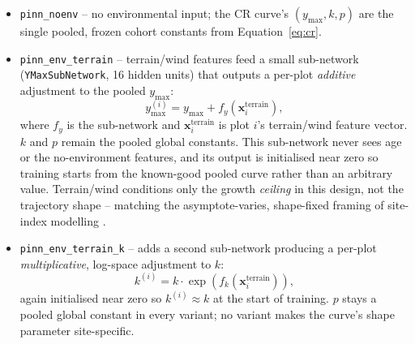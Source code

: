 \documentclass[11pt,a4paper]{report}
\begin{document}
\begin{itemize}
\setlength\itemsep{0pt}
\item \texttt{pinn\_noenv} -- no environmental input; the CR curve's $(y_{\max},k,p)$ are the
  single pooled, frozen cohort constants from Equation~\ref{eq:cr}.
\item \texttt{pinn\_env\_terrain} -- terrain/wind features feed a small sub-network
  (\texttt{YMaxSubNetwork}, 16 hidden units) that outputs a per-plot \emph{additive} adjustment to
  the pooled $y_{\max}$:
  \begin{equation}
  y_{\max}^{(i)} = y_{\max} + f_{y}\!\left(\mathbf{x}^{\text{terrain}}_i\right),
  \label{eq:ymax-adjust}
  \end{equation}
  where $f_y$ is the sub-network and $\mathbf{x}^{\text{terrain}}_i$ is plot $i$'s terrain/wind
  feature vector. $k$ and $p$ remain the pooled global constants. This sub-network never sees age
  or the no-environment features, and its output is initialised near zero so training starts from
  the known-good pooled curve rather than an arbitrary value. Terrain/wind conditions only the
  growth \emph{ceiling} in this design, not the trajectory shape -- matching the
  asymptote-varies, shape-fixed framing of site-index modelling
  \citep{socha2021}. %
\item \texttt{pinn\_env\_terrain\_k} -- adds a second sub-network producing a per-plot
  \emph{multiplicative}, log-space adjustment to $k$:
  \begin{equation}
  k^{(i)} = k \cdot \exp\!\left(f_{k}\!\left(\mathbf{x}^{\text{terrain}}_i\right)\right),
  \label{eq:k-adjust}
  \end{equation}
  again initialised near zero so $k^{(i)}\approx k$ at the start of training. $p$ stays a pooled
  global constant in every variant; no variant makes the curve's shape parameter site-specific.
\end{itemize}
\end{document}

